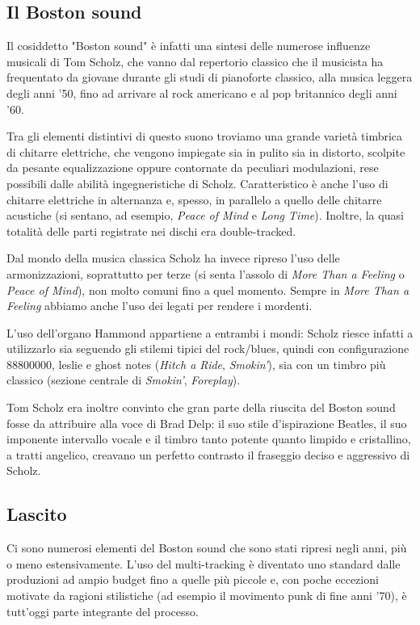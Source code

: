 \documentclass[class=book, crop=false, oneside, 12pt]{standalone}
\begin{document}
\subsection{Il Boston sound}
Il cosiddetto "Boston sound" è infatti una sintesi delle numerose influenze musicali di Tom Scholz, che vanno dal repertorio classico che il musicista ha frequentato da giovane durante gli studi di pianoforte classico, alla musica leggera degli anni '50, fino ad arrivare al rock americano e al pop britannico degli anni '60.

Tra gli elementi distintivi di questo suono troviamo una grande varietà timbrica di chitarre elettriche, che vengono impiegate sia in pulito sia in distorto, scolpite da pesante equalizzazione oppure contornate da peculiari modulazioni, rese possibili dalle abilità ingegneristiche di Scholz. Caratteristico è anche l'uso di chitarre elettriche in alternanza e, spesso, in parallelo a quello delle chitarre acustiche (si sentano, ad esempio, \emph{Peace of Mind} e \emph{Long Time}). Inoltre, la quasi totalità delle parti registrate nei dischi era double-tracked.

Dal mondo della musica classica Scholz ha invece ripreso l'uso delle armonizzazioni, soprattutto per terze (si senta l'assolo di \emph{More Than a Feeling} o \emph{Peace of Mind}), non molto comuni fino a quel momento. Sempre in \emph{More Than a Feeling}  abbiamo anche l'uso dei legati per rendere i mordenti. 

L'uso dell'organo Hammond appartiene a entrambi i mondi: Scholz riesce infatti a utilizzarlo sia seguendo gli stilemi tipici del rock/blues, quindi con configurazione \(88800000\), leslie e ghost notes (\emph{Hitch a Ride}, \emph{Smokin'}), sia con un timbro più classico (sezione centrale di \emph{Smokin'}, \emph{Foreplay}). 

Tom Scholz era inoltre convinto che gran parte della riuscita del Boston sound fosse da attribuire alla voce di Brad Delp\cite{wiki:bost_b}: il suo stile d'ispirazione Beatles, il suo imponente intervallo vocale e il timbro tanto potente quanto limpido e cristallino, a tratti angelico, creavano un perfetto contrasto il fraseggio deciso e aggressivo di Scholz.

\subsection{Lascito}
Ci sono numerosi elementi del Boston sound che sono stati ripresi negli anni, più o meno estensivamente. L'uso del multi-tracking è diventato uno standard dalle produzioni ad ampio budget fino a quelle più piccole e, con poche eccezioni motivate da ragioni stilistiche (ad esempio il movimento punk di fine anni '70), è tutt'oggi parte integrante del processo.
\end{document}
